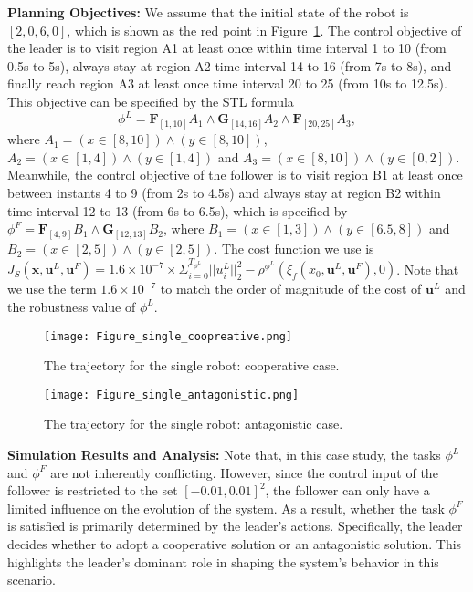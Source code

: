 \documentclass[letterpaper, 10 pt, conference]{ieeeconf}
\begin{document}
{\bf Planning Objectives: }We assume that the initial state of the robot is $[2, 0, 6, 0]$, which is shown as the red point in Figure~\ref{fig:single-coop}. 
The control objective of the leader is to visit region A1 at least once within time interval 1 to 10 (from 0.5s to 5s), always stay at region A2 time interval  14 to 16 (from 7s to 8s), and finally reach region A3 at least once time interval 20 to 25 (from 10s to 12.5s). 
This objective can be specified by the STL formula 
\[
\phi^L=\mathbf{F}_{[1,10]}A_1 \land \mathbf{G}_{[14,16]}A_2 \land \mathbf{F}_{[20,25]}A_3,\]
where 
$A_1=(x\in [8,10])\land (y\in [8,10])$, $A_2=(x\in [1,4])\land (y\in [1,4])$ and $A_3= (x\in [8,10])\land (y\in [0,2])$. 
Meanwhile, the control objective of the follower is to visit region B1 at least once between instants 4 to 9 (from 2s to 4.5s) and always stay at region B2 within time interval 12 to 13 (from 6s to 6.5s), which is specified by $\phi^F=\mathbf{F}_{[4,9]}B_1 \land \mathbf{G}_{[12,13]}B_2$, where $B_1=(x\in [1,3])\land (y\in [6.5,8])$ and $B_2= (x\in [2,5])\land (y\in [2,5])$. The cost function we use is $J_S(\mathbf{x},\mathbf{u}^L,\mathbf{u}^F)= 1.6\times 10^{-7}\times\Sigma_{i=0}^{T_{\phi^L}}||u^L_i||_2^2-\rho^{\phi^L}(\xi_f(x_0,\mathbf{u}^L,\mathbf{u}^F),0)$. Note that we use the term $1.6\times 10^{-7}$ to match the order of magnitude of the cost of $\mathbf{u}^L$ and the robustness value of $\phi^L$.

\begin{figure}[t]
    \centering
    \texttt{[image: Figure\_single\_coopreative.png]}
    \caption{The trajectory for the single robot: cooperative case.}
    \label{fig:single-coop}
\end{figure}

\begin{figure}[t]
    \centering
    \texttt{[image: Figure\_single\_antagonistic.png]}
    \caption{The trajectory for the single robot: antagonistic case.}
    \label{fig:single-anta}
\end{figure}

{\bf Simulation Results and Analysis: }
Note that, in this case study, the tasks $\phi^L$ and $\phi^F$ are not inherently conflicting. However, since the control input of the follower is restricted to the set $[-0.01, 0.01]^2$, the follower can only have a limited influence on the evolution of the system. As a result, whether the task $\phi^F$ is satisfied is primarily determined by the leader's actions. Specifically, the leader decides whether to adopt a cooperative solution or an antagonistic solution. This highlights the leader's dominant role in shaping the system's behavior in this scenario.
\end{document}
